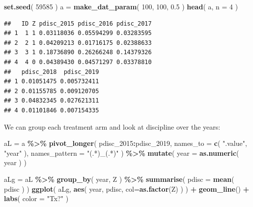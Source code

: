 \documentclass[
]{book}
\newenvironment{Shaded}{\begin{snugshade}}{\end{snugshade}}
\newcommand{\AttributeTok}[1]{\textcolor[rgb]{0.13,0.29,0.53}{#1}}
\newcommand{\DecValTok}[1]{\textcolor[rgb]{0.00,0.00,0.81}{#1}}
\newcommand{\FloatTok}[1]{\textcolor[rgb]{0.00,0.00,0.81}{#1}}
\newcommand{\FunctionTok}[1]{\textcolor[rgb]{0.13,0.29,0.53}{\textbf{#1}}}
\newcommand{\NormalTok}[1]{#1}
\newcommand{\OtherTok}[1]{\textcolor[rgb]{0.56,0.35,0.01}{#1}}
\newcommand{\SpecialCharTok}[1]{\textcolor[rgb]{0.81,0.36,0.00}{\textbf{#1}}}
\newcommand{\StringTok}[1]{\textcolor[rgb]{0.31,0.60,0.02}{#1}}
\begin{document}
\begin{Shaded}
\begin{Highlighting}[]
\FunctionTok{set.seed}\NormalTok{( }\DecValTok{59585}\NormalTok{ )}
\NormalTok{a }\OtherTok{=} \FunctionTok{make\_dat\_param}\NormalTok{( }\DecValTok{100}\NormalTok{, }\DecValTok{100}\NormalTok{, }\FloatTok{0.5}\NormalTok{ )  }
\FunctionTok{head}\NormalTok{( a, }\AttributeTok{n =} \DecValTok{4}\NormalTok{ )}
\end{Highlighting}
\end{Shaded}

\begin{verbatim}
##   ID Z pdisc_2015 pdisc_2016 pdisc_2017
## 1  1 1 0.03118036 0.05594299 0.03283595
## 2  2 1 0.04209213 0.01716175 0.02388633
## 3  3 1 0.18736890 0.26266248 0.14379326
## 4  4 0 0.04389430 0.04571297 0.03378810
##   pdisc_2018  pdisc_2019
## 1 0.01051475 0.005732411
## 2 0.01155785 0.009120705
## 3 0.04832345 0.027621311
## 4 0.01101846 0.007154335
\end{verbatim}

We can group each treatment arm and look at discipline over the years:

\begin{Shaded}
\begin{Highlighting}[]
\NormalTok{  aL }\OtherTok{=}\NormalTok{ a }\SpecialCharTok{\%\textgreater{}\%} 
        \FunctionTok{pivot\_longer}\NormalTok{( pdisc\_2015}\SpecialCharTok{:}\NormalTok{pdisc\_2019, }
                      \AttributeTok{names\_to =} \FunctionTok{c}\NormalTok{( }\StringTok{".value"}\NormalTok{, }\StringTok{"year"}\NormalTok{ ),}
                      \AttributeTok{names\_pattern =} \StringTok{"(.*)\_(.*)"}\NormalTok{ ) }\SpecialCharTok{\%\textgreater{}\%}
        \FunctionTok{mutate}\NormalTok{( }\AttributeTok{year =} \FunctionTok{as.numeric}\NormalTok{( year ) )}
    
\NormalTok{    aLg }\OtherTok{=}\NormalTok{ aL }\SpecialCharTok{\%\textgreater{}\%} \FunctionTok{group\_by}\NormalTok{( year, Z ) }\SpecialCharTok{\%\textgreater{}\%}
        \FunctionTok{summarise}\NormalTok{( }\AttributeTok{pdisc =} \FunctionTok{mean}\NormalTok{( pdisc ) )}
    \FunctionTok{ggplot}\NormalTok{( aLg, }\FunctionTok{aes}\NormalTok{( year, pdisc, }\AttributeTok{col=}\FunctionTok{as.factor}\NormalTok{(Z) ) ) }\SpecialCharTok{+}
        \FunctionTok{geom\_line}\NormalTok{() }\SpecialCharTok{+}
      \FunctionTok{labs}\NormalTok{( }\AttributeTok{color =} \StringTok{"Tx?"}\NormalTok{ )}
\end{Highlighting}
\end{Shaded}
\end{document}
